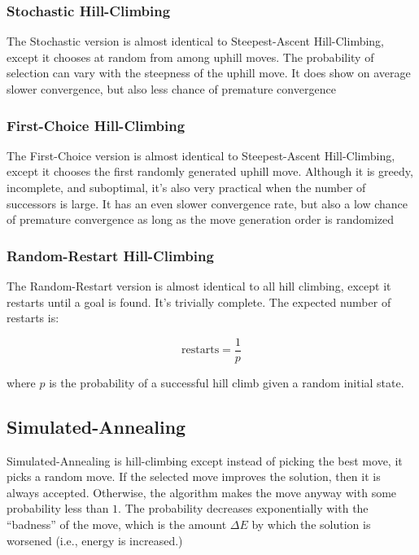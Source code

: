 \subsubsection{Stochastic Hill-Climbing}
The Stochastic version is almost identical to Steepest-Ascent Hill-Climbing, except it chooses at random from among uphill moves. The probability of selection can vary with the steepness of the uphill move. It does show on average slower convergence, but also less chance of premature convergence

\subsubsection{First-Choice Hill-Climbing}
The First-Choice version is almost identical to Steepest-Ascent Hill-Climbing, except it chooses the first randomly generated uphill move. Although it is greedy, incomplete, and suboptimal, it's also very practical when the number of successors is large. It has an even slower convergence rate, but also a low chance of premature convergence as long as the move generation order is randomized

\subsubsection{Random-Restart Hill-Climbing}
The Random-Restart version is almost identical to all hill climbing, except it restarts until a goal is found. It's trivially complete. The expected number of restarts is:

\begin{equation*}
    \text{restarts} = \frac{1}{p}
\end{equation*}

where $p$ is the probability of a successful hill climb given a random initial state.

\subsection{Simulated-Annealing}
Simulated-Annealing is hill-climbing except instead of picking the best move, it picks a random move.  If the selected move improves the solution, then it is always accepted.  Otherwise, the algorithm makes the move anyway with some probability less than $1$.  The probability decreases exponentially with the ``badness'' of the move, which is the amount $\Delta E$ by which the solution is worsened (i.e., energy is increased.)

